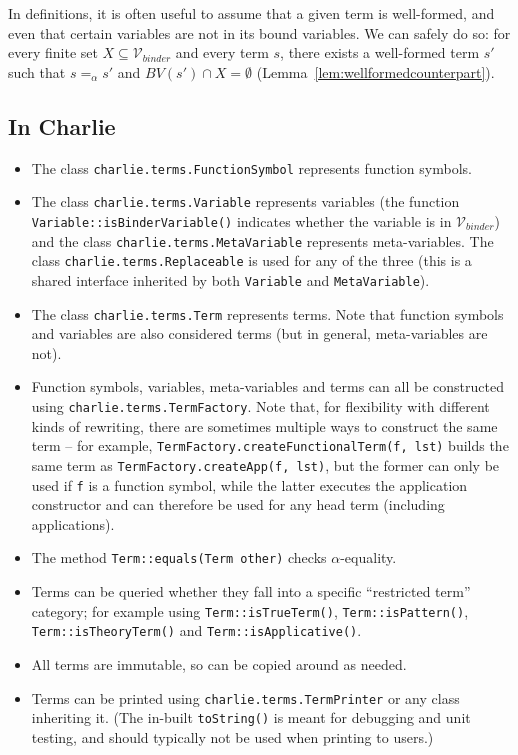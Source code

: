 \documentclass{lmcs}
\theoremstyle{theorem}\newtheorem{theorem}{Theorem}
\theoremstyle{theorem}\newtheorem{lemma}[theorem]{Lemma}
\theoremstyle{theorem}\newtheorem{corollary}[theorem]{Corollary}
\theoremstyle{definition}\newtheorem{definition}[theorem]{Definition}
\theoremstyle{definition}\newtheorem{example}[theorem]{Example}
\newcommand{\Vbound}{\mathcal{V}_{\mathit{binder}}}
\newcommand{\BV}{\mathit{BV}}
\begin{document}
In definitions, it is often useful to assume that a given term is well-formed,
and even that certain variables are not in its bound variables.  We can safely
do so: for every finite set $X \subseteq \Vbound$ and every term $s$, there
exists a well-formed term $s'$ such that $s =_\alpha s'$ and $\BV(s') \cap
X = \emptyset$ (Lemma~\ref{lem:wellformedcounterpart}).

\subsection*{In Charlie}

\begin{itemize}
\item The class \texttt{charlie.terms.FunctionSymbol} represents function
  symbols.
\item The class \texttt{charlie.terms.Variable} represents variables
  (the function\linebreak
  \texttt{Variable::isBinderVariable()} indicates whether the
  variable is in $\Vbound$) and the class \texttt{charlie.terms.MetaVariable}
  represents meta-variables.  The class\linebreak
  \texttt{charlie.terms.Replaceable}
  is used for any of the three (this is a shared interface inherited by both
  \texttt{Variable} and \texttt{MetaVariable}).
\item The class \texttt{charlie.terms.Term} represents terms.  Note that
  function symbols and variables are also considered terms (but in general,
  meta-variables are not).
\item Function symbols, variables, meta-variables and terms can all be
  constructed using \texttt{charlie.terms.TermFactory}.  Note that, for
  flexibility with different kinds of rewriting, there are sometimes multiple
  ways to construct the same term -- for example,
  \texttt{TermFactory.createFunctionalTerm(f, lst)} builds the same term as
  \texttt{TermFactory.createApp(f, lst)}, but the former can only be used if
  \texttt{f} is a function symbol, while the latter executes the application
  constructor and can therefore be used for any head term (including
  applications).
\item The method \texttt{Term::equals(Term other)} checks $\alpha$-equality.
\item Terms can be queried whether they fall into a specific ``restricted term''
  category; for example using \texttt{Term::isTrueTerm()},
  \texttt{Term::isPattern()}, \texttt{Term::isTheoryTerm()}
  and \texttt{Term::isApplicative()}.
\item All terms are immutable, so can be copied around as needed.
\item Terms can be printed using \texttt{charlie.terms.TermPrinter} or any class
  inheriting it.
  (The in-built \texttt{toString()} is meant for debugging and unit testing, and
  should typically not be used when printing to users.)
\end{itemize}
\end{document}
